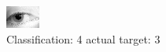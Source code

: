 \begin{figure}[h!]
\begin{center}
\includegraphics[width=0.60\columnwidth]{figures/ID1396_class_4_target_3.png}
\end{center}
\caption{ Classification: 4 actual target: 3}
\label{fig:ID1396_class_4_target_3}
\end{figure}
